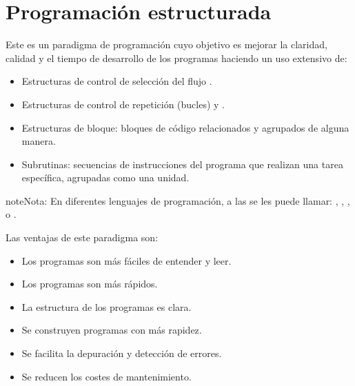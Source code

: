 \documentclass[letterpaper,10pt,spanish]{sphinxmanual}
\begin{document}
\section{Programación estructurada}
\label{\detokenize{lenguajes_alto_nivel_clasificacion:programacion-estructurada}}
\sphinxAtStartPar
Este es un paradigma de programación cuyo objetivo es mejorar la claridad, calidad y el tiempo de desarrollo de los programas haciendo un uso extensivo de:
\begin{itemize}
\item {} 
\sphinxAtStartPar
Estructuras de control de selección del flujo .

\item {} 
\sphinxAtStartPar
Estructuras de control de repetición (bucles)  y .

\item {} 
\sphinxAtStartPar
Estructuras de bloque: bloques de código relacionados y agrupados de alguna manera.

\item {} 
\sphinxAtStartPar
Subrutinas: secuencias de instrucciones del programa que realizan una tarea específica, agrupadas como una unidad.

\end{itemize}

\begin{sphinxadmonition}{note}{Nota:}
\sphinxAtStartPar
En diferentes lenguajes de programación, a las  se les puede llamar: , , ,  o .
\end{sphinxadmonition}

\sphinxAtStartPar
Las ventajas de este paradigma son:
\begin{itemize}
\item {} 
\sphinxAtStartPar
Los programas son más fáciles de entender y leer.

\item {} 
\sphinxAtStartPar
Los programas son más rápidos.

\item {} 
\sphinxAtStartPar
La estructura de los programas es clara.

\item {} 
\sphinxAtStartPar
Se construyen programas con más rapidez.

\item {} 
\sphinxAtStartPar
Se facilita la depuración y detección de errores.

\item {} 
\sphinxAtStartPar
Se reducen los costes de mantenimiento.

\end{itemize}
\end{document}
